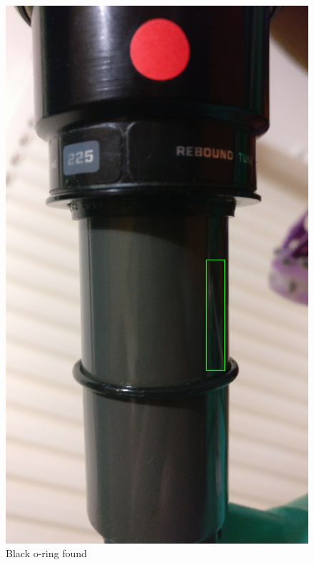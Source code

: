 			\begin{figure}[h!]
				\centering
				\includegraphics[scale=0.1,trim={20cm 40cm 20cm 70cm},clip]{../images/results/fox_oring.jpg}
				\caption{Black o-ring found}
				\label{fig:black_oring}
			\end{figure}
